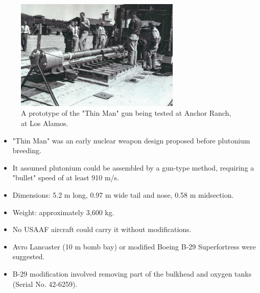 \documentclass{loyola-beamer}
\begin{document}
\begin{frame}
	\begin{figure}
		\begin{center}
			\includegraphics[width=0.7\textwidth]{./figures/Thin_Man_testing_at_Anchor_Ranch.jpg}
		\end{center}
		\caption{A prototype of the "Thin Man" gun being tested at Anchor Ranch, at Los Alamos.}\label{fig:thin man img}
	\end{figure}
\end{frame}

\begin{frame}
	\begin{itemize}
		\item "Thin Man" was an early nuclear weapon design proposed before plutonium breeding.
		\item It assumed plutonium could be assembled by a gun-type method, requiring a "bullet" speed of at least 910 m/s.
		\item Dimensions: 5.2 m long, 0.97 m wide tail and nose, 0.58 m midsection.
		\item Weight: approximately 3,600 kg.
		\item No USAAF aircraft could carry it without modifications.
		\item Avro Lancaster (10 m bomb bay) or modified Boeing B-29 Superfortress were suggested.
		\item B-29 modification involved removing part of the bulkhead and oxygen tanks (Serial No. 42-6259).
	\end{itemize}
\end{frame}
\end{document}
